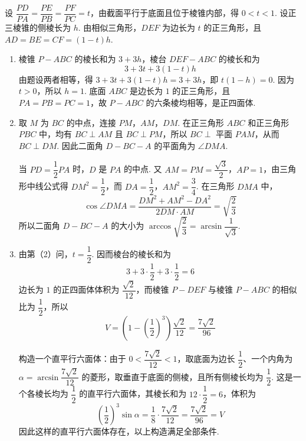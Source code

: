 \begin{solution}
设 \(\dfrac{PD}{PA}=\dfrac{PE}{PB}=\dfrac{PF}{PC}=t\)，由截面平行于底面且位于棱锥内部，得 \(0<t<1\). 设正三棱锥的侧棱长为 \(h\). 由相似三角形，\(DEF\) 为边长为 \(t\) 的正三角形，且 \(AD=BE=CF=(1-t)h\).

\begin{enumerate}
\item 棱锥 \(P-ABC\) 的棱长和为 \(3+3h\)，棱台 \(DEF-ABC\) 的棱长和为
\[
3+3t+3(1-t)h
\]
由题设两者相等，得 \(3+3t+3(1-t)h=3+3h\)，即 \(t(1-h)=0\). 因为 \(t>0\)，所以 \(h=1\). 底面 \(ABC\) 是边长为 \(1\) 的正三角形，且 \(PA=PB=PC=1\)，故 \(P-ABC\) 的六条棱均相等，是正四面体.

\item 取 \(M\) 为 \(BC\) 的中点，连接 \(PM\)，\(AM\)，\(DM\). 在正三角形 \(ABC\) 和正三角形 \(PBC\) 中，均有 \(BC\perp AM\) 且 \(BC\perp PM\)，所以 \(BC\perp\) 平面 \(PAM\)，从而 \(BC\perp DM\). 因此二面角 \(D-BC-A\) 的平面角为 \(\angle DMA\).

当 \(PD=\dfrac12PA\) 时，\(D\) 是 \(PA\) 的中点. 又 \(AM=PM=\dfrac{\sqrt{3}}{2}\)，\(AP=1\)，由三角形中线公式得 \(DM^{2}=\dfrac12\)，而 \(DA=\dfrac12\)，\(AM^{2}=\dfrac34\). 在三角形 \(DMA\) 中，
\[
\cos\angle DMA=\frac{DM^{2}+AM^{2}-DA^{2}}{2DM\cdot AM}=\sqrt{\frac{2}{3}}
\]
所以二面角 \(D-BC-A\) 的大小为 \(\arccos\sqrt{\dfrac{2}{3}}=\arcsin\dfrac{1}{\sqrt{3}}\).

\item 由第（2）问，\(t=\dfrac12\). 因而棱台的棱长和为
\[
3+3\cdot\frac12+3\cdot\frac12=6
\]
边长为 \(1\) 的正四面体体积为 \(\dfrac{\sqrt{2}}{12}\)，而棱锥 \(P-DEF\) 与棱锥 \(P-ABC\) 的相似比为 \(\dfrac12\)，所以
\[
V=\left(1-\left(\frac12\right)^{3}\right)\frac{\sqrt{2}}{12}=\frac{7\sqrt{2}}{96}
\]

构造一个直平行六面体：由于 \(0<\dfrac{7\sqrt{2}}{12}<1\)，取底面为边长 \(\dfrac12\)、一个内角为 \(\alpha=\arcsin\dfrac{7\sqrt{2}}{12}\) 的菱形，取垂直于底面的侧棱，且所有侧棱长均为 \(\dfrac12\). 这是一个各棱长均为 \(\dfrac12\) 的直平行六面体，其棱长和为 \(12\cdot\dfrac12=6\)，体积为
\[
\left(\frac12\right)^{3}\sin\alpha=\frac18\cdot\frac{7\sqrt{2}}{12}=\frac{7\sqrt{2}}{96}=V
\]
因此这样的直平行六面体存在，以上构造满足全部条件.
\end{enumerate}
\end{solution}

